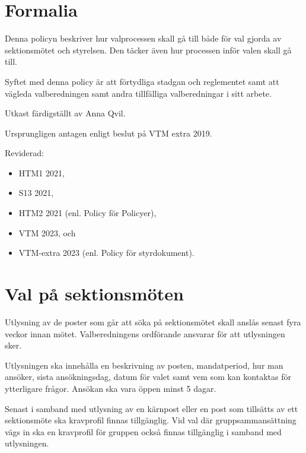 \documentclass{dsekpolicy}
\begin{document}
\maketitle
\section{Formalia}

  Denna policyn beskriver hur valprocessen skall gå till både för val gjorda av
  sektionsmötet och styrelsen. Den täcker även hur processen inför valen skall
  gå till.

  Syftet med denna policy är att förtydliga stadgan och reglementet samt att
  vägleda valberedningen samt andra tillfälliga valberedningar i sitt arbete.

  Utkast färdigställt av Anna Qvil.

  Ursprungligen antagen enligt beslut på VTM extra 2019.

  Reviderad:
  \begin{itemize}
    \item HTM1 2021,
    \item S13 2021,
    \item HTM2 2021 (enl. Policy för Policyer),
    \item VTM 2023, och
    \item VTM-extra 2023 (enl. Policy för styrdokument).
  \end{itemize}

\section{Val på sektionsmöten}

  Utlysning av de poster som går att söka på sektionsmötet skall anslås senast
  fyra veckor innan mötet. Valberedningens ordförande ansvarar för att utlysningen
  sker.

  Utlysningen ska innehålla en beskrivning av posten, mandatperiod, hur man
  ansöker, sista ansökningsdag, datum för valet samt vem som kan kontaktas för
  ytterligare frågor. Ansökan ska vara öppen minst 5 dagar.

  Senast i samband med utlysning av en kärnpost eller en post som tillsätts av ett
  sektionsmöte ska kravprofil finnas tillgänglig. Vid val där gruppsammansättning
  vägs in ska en kravprofil för gruppen också finnas tillgänglig i samband med
  utlysningen.
\end{document}
